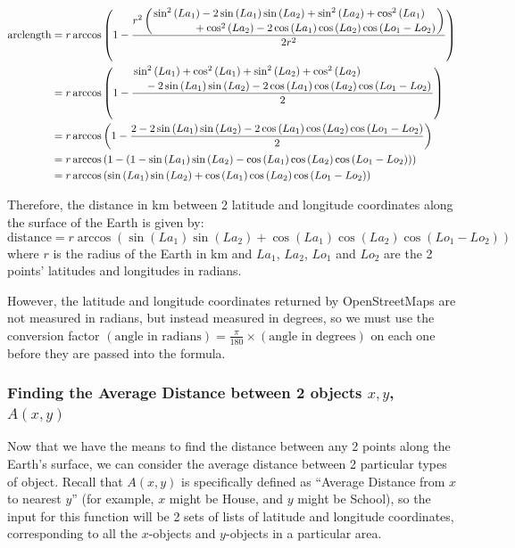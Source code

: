 \documentclass[12pt]{report}
\newcommand{\comma}{,}
\begin{document}
\begin{equation}
\begin{split}
    \text{arclength}&=r\arccos \left(1-\frac{r^{2}\left(\splitdfrac{\sin^{2}\left(La_{1}\right)-2\sin\left(La_{1}\right)\sin\left(La_{2}\right)+\sin^{2}\left(La_{2}\right)+\cos^{2}\left(La_{1}\right)}{+\cos^{2}\left(La_{2}\right)-2\cos \left(La_{1}\right)\cos \left(La_{2}\right)\cos \left(Lo_{1}-Lo_{2}\right)}\right)}{2r^{2}}\right)\\
    &=r\arccos \left(1-\frac{\splitdfrac{\sin^{2}\left(La_{1}\right)+\cos^{2}\left(La_{1}\right)+\sin^{2}\left(La_{2}\right)+\cos^{2}\left(La_{2}\right)}{-2\sin\left(La_{1}\right)\sin\left(La_{2}\right)-2\cos \left(La_{1}\right)\cos \left(La_{2}\right)\cos \left(Lo_{1}-Lo_{2}\right)}}{2}\right)\\
    &=r\arccos \left(1-\frac{2-2\sin\left(La_{1}\right)\sin\left(La_{2}\right)-2\cos \left(La_{1}\right)\cos \left(La_{2}\right)\cos \left(Lo_{1}-Lo_{2}\right)}{2}\right)\\
    &=r\arccos \left(1-\left(1-\sin\left(La_{1}\right)\sin\left(La_{2}\right)-\cos \left(La_{1}\right)\cos \left(La_{2}\right)\cos \left(Lo_{1}-Lo_{2}\right)\right)\right)\\
    &=r\arccos \left(\sin\left(La_{1}\right)\sin\left(La_{2}\right)+\cos \left(La_{1}\right)\cos \left(La_{2}\right)\cos \left(Lo_{1}-Lo_{2}\right)\right)
\end{split}
\end{equation}

Therefore, the distance in \unit{km} between 2 latitude and longitude coordinates along the surface of the Earth is given by:
\begin{equation}\label{eq:dist2points}
    \text{distance}=r\arccos \left(\sin\left(La_{1}\right)\sin\left(La_{2}\right)+\cos \left(La_{1}\right)\cos \left(La_{2}\right)\cos \left(Lo_{1}-Lo_{2}\right)\right)
\end{equation}
where $r$ is the radius of the Earth in \unit{km} and $La_1$, $La_2$, $Lo_1$ and $Lo_2$ are the 2 points' latitudes and longitudes in radians.

However, the latitude and longitude coordinates returned by OpenStreetMaps are not measured in radians, but instead measured in degrees, so we must use the conversion factor $\left(\text{angle in radians}\right)=\frac{\pi}{180}\times\left(\text{angle in degrees}\right)$ on each one before they are passed into the formula.

\subsubsection{Finding the Average Distance between 2 objects $x,y$, $A\left(x\comma{}y\right)$}
Now that we have the means to find the distance between any 2 points along the Earth's surface, we can consider the average distance between 2 particular types of object. Recall that $A\left(x,y\right)$ is specifically defined as ``Average Distance from $x$ to nearest $y$'' (for example, $x$ might be House, and $y$ might be School), so the input for this function will be 2 sets of lists of latitude and longitude coordinates, corresponding to all the $x$-objects and $y$-objects in a particular area.
\end{document}

